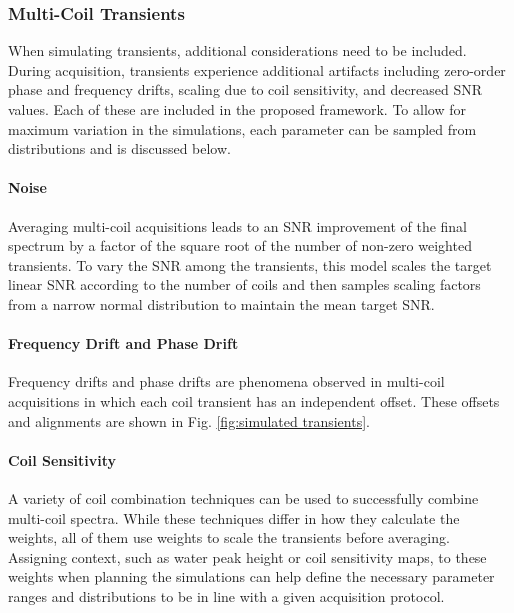 \subsubsection{Multi-Coil Transients}
When simulating transients, additional considerations need to be included. 
During acquisition, transients 
experience additional artifacts including zero-order phase and frequency drifts, scaling due to coil sensitivity, and decreased SNR values. Each of these are included in the proposed framework. To allow for maximum variation in the simulations, each parameter can be sampled from distributions and is discussed below.

\paragraph{Noise} Averaging multi-coil acquisitions leads to an SNR improvement of the final spectrum by a factor of the square root of the number of non-zero weighted transients. To vary the SNR among the transients, this model scales the target linear SNR according to the number of coils and then samples scaling factors from a narrow normal distribution to maintain the mean target SNR. 

\paragraph{Frequency Drift and Phase Drift}
Frequency drifts and phase drifts are phenomena observed in multi-coil acquisitions in which each coil transient has an independent offset. %
These offsets and alignments are shown in Fig. \ref{fig:simulated transients}.


 
\paragraph{Coil Sensitivity}
A variety of coil combination techniques can be used to successfully combine multi-coil spectra. While these techniques differ in how they calculate the weights, all of them use weights to scale the transients before averaging. Assigning context, such as water peak height or coil sensitivity maps, to these weights when planning the simulations can help define the necessary parameter ranges and distributions to be in line with a given acquisition protocol.
 
